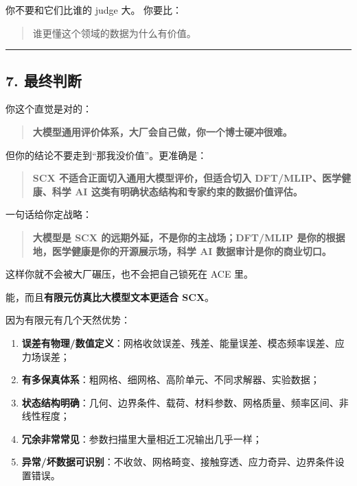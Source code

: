 \documentclass[
  12pt,
]{ctexart}
\providecommand{\tightlist}{%
  \setlength{\itemsep}{0pt}\setlength{\parskip}{0pt}}
\begin{document}
你不要和它们比谁的 judge 大。 你要比：

\begin{quote}
谁更懂这个领域的数据为什么有价值。
\end{quote}

\begin{center}\rule{0.5\linewidth}{0.5pt}\end{center}

\subsection{7. 最终判断}\label{ux6700ux7ec8ux5224ux65ad-6}

你这个直觉是对的：

\begin{quote}
\textbf{大模型通用评价体系，大厂会自己做，你一个博士硬冲很难。}
\end{quote}

但你的结论不要走到``那我没价值''。更准确是：

\begin{quote}
\textbf{SCX 不适合正面切入通用大模型评价，但适合切入
DFT/MLIP、医学健康、科学 AI
这类有明确状态结构和专家约束的数据价值评估。}
\end{quote}

一句话给你定战略：

\begin{quote}
\textbf{大模型是 SCX 的远期外延，不是你的主战场；DFT/MLIP
是你的根据地，医学健康是你的开源展示场，科学 AI
数据审计是你的商业切口。}
\end{quote}

这样你就不会被大厂碾压，也不会把自己锁死在 ACE 里。

能，而且\textbf{有限元仿真比大模型文本更适合 SCX}。

因为有限元有几个天然优势：

\begin{enumerate}
\def\labelenumi{\arabic{enumi}.}
\tightlist
\item
  \textbf{误差有物理/数值定义}：网格收敛误差、残差、能量误差、模态频率误差、应力场误差；
\item
  \textbf{有多保真体系}：粗网格、细网格、高阶单元、不同求解器、实验数据；
\item
  \textbf{状态结构明确}：几何、边界条件、载荷、材料参数、网格质量、频率区间、非线性程度；
\item
  \textbf{冗余非常常见}：参数扫描里大量相近工况输出几乎一样；
\item
  \textbf{异常/坏数据可识别}：不收敛、网格畸变、接触穿透、应力奇异、边界条件设置错误。
\end{enumerate}
\end{document}
